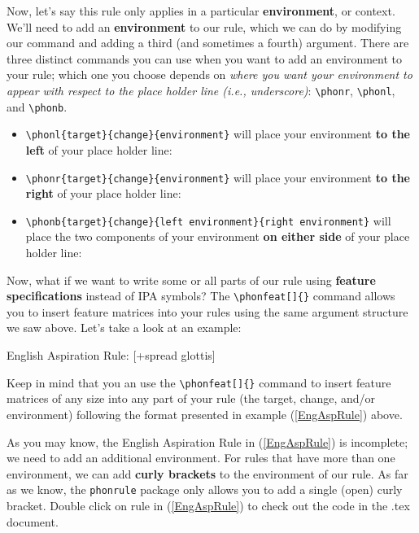 \documentclass{article}
\begin{document}

Now, let's say this rule only applies in a particular \textbf{environment}, or context. We'll need to add an \textbf{environment} to our rule, which we can do by modifying our command and adding a third (and sometimes a fourth) argument. There are three distinct commands you can use when you want to add an environment to your rule; which one you choose depends on \textit{where you want your environment to appear with respect to the place holder line (i.e., underscore)}: \verb|\phonr|, \verb|\phonl|, and \verb|\phonb|.
\begin{itemize}
    \item \verb|\phonl{target}{change}{environment}| will place your environment \textbf{to the left} of your place holder line: 
    \item \verb|\phonr{target}{change}{environment}| will place your environment \textbf{to the right} of your place holder line: \phonr{e}{i}{]\subs{word}}
    \item \verb|\phonb{target}{change}{left environment}{right environment}| will place the two components of your environment \textbf{on either side} of your place holder line: 
\end{itemize}

Now, what if we want to write some or all parts of our rule using \textbf{feature specifications} instead of IPA symbols? The \verb|\phonfeat[]{}| command allows you to insert feature matrices into your rules using the same argument structure we saw above. Let's take a look at an example:

\ea \label{EngAspRule}
English Aspiration Rule: 
{[+spread glottis]}
{} 
\z

\noindent Keep in mind that you an use the \verb|\phonfeat[]{}| command to insert feature matrices of any size into any part of your rule (the target, change, and/or environment) following the format presented in example (\ref{EngAspRule}) above.

As you may know, the English Aspiration Rule in (\ref{EngAspRule}) is incomplete; we need to add an additional environment. For rules that have more than one environment, we can add \textbf{curly brackets} to the environment of our rule. As far as we know, the \texttt{phonrule} package only allows you to add a single (open) curly bracket. Double click on rule in (\ref{EngAspRule}) to check out the code in the .tex document.
\end{document}
